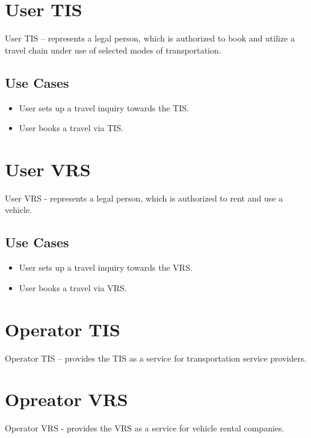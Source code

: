 \section*{User TIS}
User TIS – represents a legal person, which is authorized to book and utilize a travel chain under use of selected modes of transportation.

\subsection*{Use Cases}
\begin{itemize}
\item User sets up a travel inquiry towards the TIS.
\item User books a travel via TIS.
\end{itemize}

\section*{User VRS}
User VRS - represents a legal person, which is authorized to rent and use a vehicle.

\subsection*{Use Cases}
\begin{itemize}
\item User sets up a travel inquiry towards the VRS.
\item User books a travel via VRS.
\end{itemize}

\section*{Operator TIS}
Operator TIS – provides the TIS as a service for transportation service providers.


\section*{Opreator VRS}
Operator VRS - provides the VRS as a service for vehicle rental companies.

